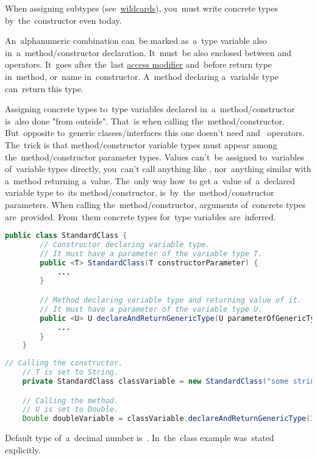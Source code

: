 \note When assigning subtypes (see~\hyperref[javagenericswildcards]{wildcards}), you~must write concrete types by~the~constructor even today.

\label{javagenericmethod}
An~alphanumeric combination can~be marked as~a~type variable also in~a~method/constructor declaration.
It~must~be also enclosed between  and~ operators.
It~goes after the~last \hyperref[javaaccessmodifiers]{access modifier} and~before return type in~method, or~name in~constructor.
A~method declaring a~variable type can~return this type.

Assigning concrete types to~type variables declared in~a~method/constructor is~also done "from outside".
That~is when calling the~method/constructor.
But~opposite to~generic classes/interfaces this one doesn't need  and~ operators.
The~trick is that method/constructor variable types must appear among the~method/constructor parameter types.
Values can't~be assigned to~variables of~variable types directly, you~can't call anything like , nor~anything similar with a~method returning a~value.
The~only way how~to get a~value of~a~declared variable type to~its method/constructor, is~by~the~method/constructor parameters.
When calling the~method/constructor, arguments of~concrete types are~provided.
From~them concrete types for~type variables are~inferred.

\begin{lstlisting}[language=Java, title={Class with constructor and method delcaring variable types}]
    public class StandardClass {
        // Constructor declaring variable type.
        // It must have a parameter of the variable type T.
        public <T> StandardClass(T constructorParameter) {
            ...
        }

        // Method declaring variable type and returning value of it.
        // It must have a parameter of the variable type U.
        public <U> U declareAndReturnGenericType(U parameterOfGenericType) {
            ...
        }
    }
\end{lstlisting}
\newpage

\begin{lstlisting}[language=Java, title={Concrete types assignment}]
    // Calling the constructor.
    // T is set to String.
    private StandardClass classVariable = new StandardClass("some string");

    // Calling the method.
    // U is set to Double.
    Double doubleVariable = classVariable.declareAndReturnGenericType(3.14);
\end{lstlisting}
\notenonl Default type of~a~decimal number is~.
In~the~class example  was~stated explicitly.

